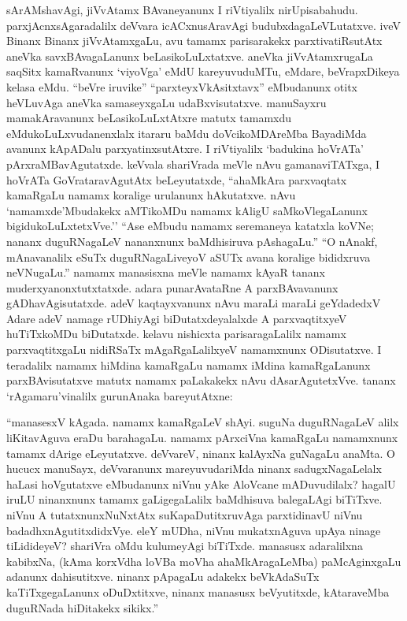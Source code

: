sArAMshavAgi, jiVvAtamx BAvaneyanunx I riVtiyalilx nirUpisabahudu. parxjAcnxsAgaradalilx deVvara icACxnusAravAgi budubxdagaLeVLutatxve. iveV Binanx Binanx jiVvAtamxgaLu, avu tamamx parisarakekx parxtivatiRsutAtx aneVka savxBAvagaLanunx beLasikoLuLxtatxve. aneVka jiVvAtamxrugaLa saqSitx kamaRvanunx `viyoVga' eMdU kareyuvuduMTu, eMdare, beVrapxDikeya kelasa eMdu. ``beVre iruvike'' ``parxteyxVkAsitxtavx'' eMbudanunx otitx heVLuvAga aneVka samaseyxgaLu udaBxvisutatxve. manuSayxru mamakAravanunx beLasikoLuLxtAtxre matutx tamamxdu eMdukoLuLxvudanenxlalx itararu baMdu doVcikoMDAreMba BayadiMda avanunx kApADalu parxyatinxsutAtxre. I riVtiyalilx `badukina hoVrATa' pArxraMBavAgutatxde. keVvala shariVrada meVle nAvu gamanaviTATxga, I hoVrATa GoVrataravAgutAtx beLeyutatxde, ``ahaMkAra parxvaqtatx kamaRgaLu namamx koralige urulanunx hAkutatxve. nAvu `namamxde'Mbudakekx aMTikoMDu namamx kAligU saMkoVlegaLanunx bigidukoLuLxtetxVve.'' ``Ase eMbudu namamx seremaneya katatxla koVNe; nananx duguRNagaLeV nananxnunx baMdhisiruva pAshagaLu.'' ``O nAnakf, mAnavanalilx eSuTx duguRNagaLiveyoV aSUTx avana koralige bididxruva neVNugaLu.'' namamx manasisxna meVle namamx kAyaR tananx muderxyanonxtutxtatxde. adara punarAvataRne A parxBAvavanunx gADhavAgisutatxde. adeV kaqtayxvanunx nAvu maraLi maraLi geYdadedxV Adare adeV namage rUDhiyAgi biDutatxdeyalalxde A parxvaqtitxyeV huTiTxkoMDu biDutatxde. kelavu nishicxta parisaragaLalilx namamx parxvaqtitxgaLu nidiRSaTx mAgaRgaLalilxyeV namamxnunx ODisutatxve. I teradalilx namamx hiMdina kamaRgaLu namamx iMdina kamaRgaLanunx parxBAvisutatxve matutx namamx paLakakekx nAvu dAsarAgutetxVve. tananx `rAgamaru'vinalilx gurunAnaka bareyutAtxne:

``manasesxV kAgada. namamx kamaRgaLeV shAyi. suguNa duguRNagaLeV alilx liKitavAguva eraDu barahagaLu. namamx pArxciVna kamaRgaLu namamxnunx tamamx dArige eLeyutatxve. deVvareV, ninanx kalAyxNa guNagaLu anaMta. O hucucx manuSayx, deVvaranunx mareyuvudariMda ninanx sadugxNagaLelalx haLasi hoVgutatxve eMbudanunx niVnu yAke AloVcane mADuvudilalx? hagalU iruLU ninanxnunx tamamx gaLigegaLalilx baMdhisuva balegaLAgi biTiTxve. niVnu A tutatxnunxNuNxtAtx suKapaDutitxruvAga parxtidinavU niVnu badadhxnAgutitxdidxVye. eleY mUDha, niVnu mukatxnAguva upAya ninage tiLidideyeV? shariVra oMdu kulumeyAgi biTiTxde. manasusx adaralilxna kabibxNa, (kAma korxVdha loVBa moVha ahaMkAragaLeMba) paMcAginxgaLu adanunx dahisutitxve. ninanx pApagaLu adakekx beVkAdaSuTx kaTiTxgegaLanunx oDuDxtitxve, ninanx manasusx beVyutitxde, kAtaraveMba duguRNada hiDitakekx sikikx.''

